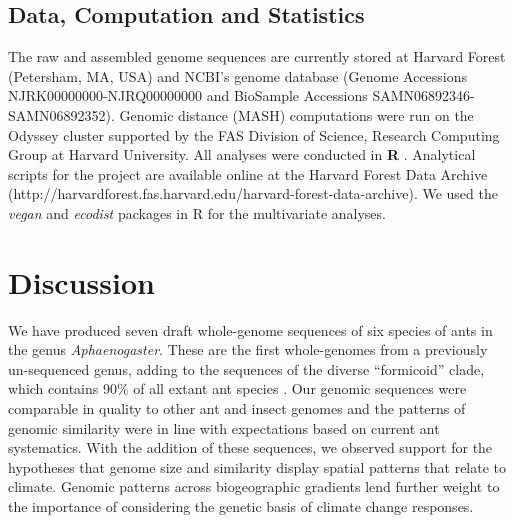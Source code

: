 \documentclass[fleqn,10pt,lineno]{wlpeerj} %
\begin{document}


\subsection*{Data, Computation and Statistics}

The raw and assembled genome sequences are currently stored at Harvard
Forest (Petersham, MA, USA) and NCBI's genome database (Genome
Accessions NJRK00000000-NJRQ00000000 and BioSample Accessions
SAMN06892346-SAMN06892352). Genomic distance (MASH) computations were
run on the Odyssey cluster supported by the FAS Division of Science,
Research Computing Group at Harvard University. All analyses were
conducted in \textbf{R} \citep{RCoreTeam2017}. Analytical scripts for
the project are available online at the Harvard Forest Data Archive
(http://harvardforest.fas.harvard.edu/harvard-forest-data-archive). We
used the \textit{vegan} \citep{Oksanen2016} and \textit{ecodist}
\citep{Goslee2007} packages in R for the multivariate analyses.

\newpage
\clearpage

\section*{Discussion}

We have produced seven draft whole-genome sequences of six species of
ants in the genus \textit{Aphaenogaster}. These are the first
whole-genomes from a previously un-sequenced genus, adding to the
sequences of the diverse ``formicoid'' clade, which contains 90\% of
all extant ant species \citep{Ward2014}.  Our genomic sequences were
comparable in quality to other ant and insect genomes and the patterns
of genomic similarity were in line with expectations based on current
ant systematics. With the addition of these sequences, we observed
support for the hypotheses that genome size and similarity display
spatial patterns that relate to climate. Genomic patterns across
biogeographic gradients lend further weight to the importance of
considering the genetic basis of climate change responses.
\end{document}

